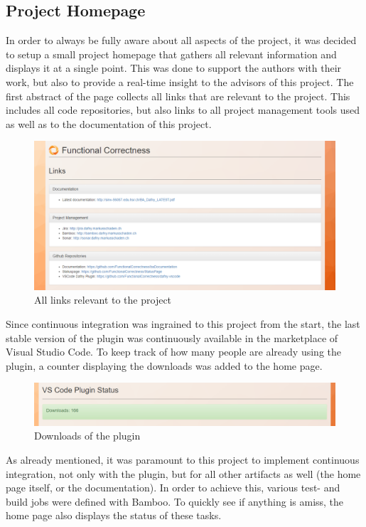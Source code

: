 \subsection{Project Homepage}
In order to always be fully aware about all aspects of the project, it was decided to setup a small project homepage that gathers all relevant information and displays it at a single point. This was done to support the authors with their work, but also to provide a real-time insight to the advisors of this project. \newline
The first abstract of the page collects all links that are relevant to the project. This includes all code repositories, but also links to all project management tools used as well as to the documentation of this project.  \newline
\begin{figure}[H]
	\centering
	\includegraphics[width=1\textwidth]{img/homeLinks}
	\caption{All links relevant to the project}
	\label{fig:Project Links}
\end{figure}
Since continuous integration was ingrained to this project from the start, the last stable version of the plugin was continuously available in the marketplace of Visual Studio Code. To keep track of how many people are already using the plugin, a counter displaying the downloads was added to the home page. \newline
\begin{figure}[H]
	\centering
	\includegraphics[width=1\textwidth]{img/homeCounter}
	\caption{Downloads of the plugin}
	\label{fig:Plugin Downloads}
\end{figure}
As already mentioned, it was paramount to this project to implement continuous integration, not only with the plugin, but for all other artifacts as well (the home page itself, or the documentation). In order to achieve this, various test- and build jobs were defined with Bamboo. To quickly see if anything is amiss, the home page also displays the status of these tasks. \newline
